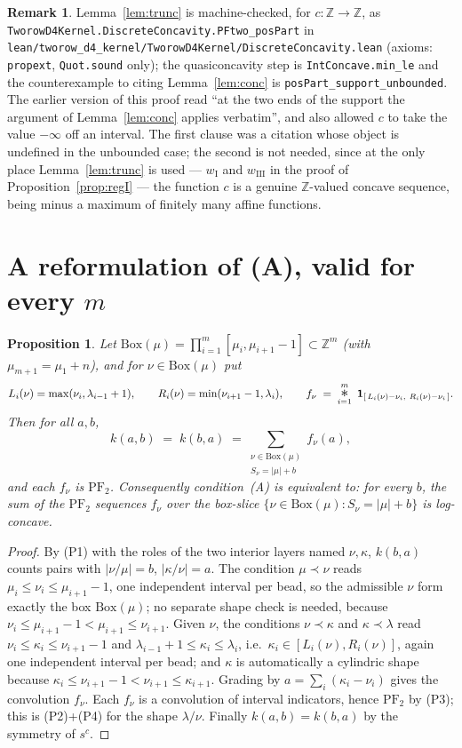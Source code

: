 \documentclass[11pt]{article}
\theoremstyle{plain}
\newtheorem{proposition}[theorem]{Proposition}
\theoremstyle{definition}
\newtheorem{remark}[theorem]{Remark}
\newcommand{\Z}{\mathbb{Z}}
\newcommand{\PFtwo}{\mathrm{PF}_2}
\newcommand{\Bx}{\mathrm{Box}}
\begin{document}
\begin{remark}\label{rem:truncLean}
Lemma~\ref{lem:trunc} is machine-checked, for $c:\Z\to\Z$, as
\verb|TworowD4Kernel.DiscreteConcavity.PFtwo_posPart| in
\verb|lean/tworow_d4_kernel/TworowD4Kernel/DiscreteConcavity.lean| (axioms: \verb|propext|,
\verb|Quot.sound| only); the quasiconcavity step is \verb|IntConcave.min_le| and the
counterexample to citing Lemma~\ref{lem:conc} is \verb|posPart_support_unbounded|. The
earlier version of this proof read ``at the two ends of the support the argument of
Lemma~\ref{lem:conc} applies verbatim'', and also allowed $c$ to take the value $-\infty$
off an interval. The first clause was a citation whose object is undefined in the
unbounded case; the second is not needed, since at the only place Lemma~\ref{lem:trunc} is
used --- $w_{\mathrm I}$ and $w_{\mathrm{III}}$ in the proof of
Proposition~\ref{prop:regI} --- the function $c$ is a genuine $\Z$-valued concave
sequence, being minus a maximum of finitely many affine functions.
\end{remark}

\section{A reformulation of (A), valid for every $m$}

\begin{proposition}\label{prop:reform}
Let $\Bx(\mu)=\prod_{i=1}^{m}[\mu_i,\mu_{i+1}-1]\subset\Z^m$ (with $\mu_{m+1}=\mu_1+n$),
and for $\nu\in\Bx(\mu)$ put
\[
  L_i(\nu)=\max(\nu_i,\lambda_{i-1}+1),\qquad
  R_i(\nu)=\min(\nu_{i+1}-1,\lambda_i),\qquad
  f_\nu \;=\; \mathop{\text{\Large$*$}}_{i=1}^{m}\ \mathbf 1_{[\,L_i(\nu)-\nu_i,\ R_i(\nu)-\nu_i\,]} .
\]
Then for all $a,b$,
\[
  k(a,b)\;=\;k(b,a)\;=\!\!\sum_{\substack{\nu\in\Bx(\mu)\\ S_\nu=|\mu|+b}}\!\! f_\nu(a),
\]
and each $f_\nu$ is $\PFtwo$. Consequently condition~(A) is equivalent to:
\emph{for every $b$, the sum of the $\PFtwo$ sequences $f_\nu$ over the box-slice
$\{\nu\in\Bx(\mu):S_\nu=|\mu|+b\}$ is log-concave.}
\end{proposition}

\begin{proof}
By (P1) with the roles of the two interior layers named $\nu,\kappa$, $k(b,a)$ counts pairs
with $|\nu/\mu|=b$, $|\kappa/\nu|=a$. The condition $\mu\prec\nu$ reads
$\mu_i\le\nu_i\le\mu_{i+1}-1$, one independent interval per bead, so the admissible $\nu$
form exactly the box $\Bx(\mu)$; no separate shape check is needed, because
$\nu_i\le\mu_{i+1}-1<\mu_{i+1}\le\nu_{i+1}$. Given $\nu$, the conditions $\nu\prec\kappa$
and $\kappa\prec\lambda$ read $\nu_i\le\kappa_i\le\nu_{i+1}-1$ and
$\lambda_{i-1}+1\le\kappa_i\le\lambda_i$, i.e.\ $\kappa_i\in[L_i(\nu),R_i(\nu)]$, again one
independent interval per bead; and $\kappa$ is automatically a cylindric shape because
$\kappa_i\le\nu_{i+1}-1<\nu_{i+1}\le\kappa_{i+1}$. Grading by
$a=\sum_i(\kappa_i-\nu_i)$ gives the convolution $f_\nu$. Each $f_\nu$ is a convolution of
interval indicators, hence $\PFtwo$ by (P3); this is (P2)+(P4) for the shape
$\lambda/\nu$. Finally $k(a,b)=k(b,a)$ by the symmetry of $s^c$.
\end{proof}
\end{document}
